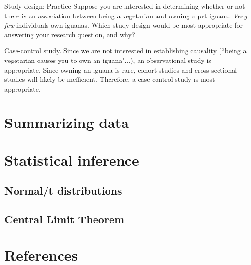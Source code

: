 \documentclass[10pt,t]{beamer}
\begin{document}
\begin{frame}{Study design: Practice}
Suppose you are interested in determining whether or not there is an association between being a vegetarian and owning a pet iguana. \textit{Very few} individuals own iguanas. Which study design would be most appropriate for answering your research question, and why? 

\vspace{0.3cm}

\color{cyan} Case-control study. Since we are not interested in establishing causality (``being a vegetarian causes you to own an iguana"...), an observational study is appropriate. Since owning an iguana is rare, cohort studies and cross-sectional studies will likely be inefficient. Therefore, a case-control study is most appropriate.

\end{frame}

\section{Summarizing data}

\section{Statistical inference}

\subsection{Normal/t distributions}

\subsection{Central Limit Theorem}

\section*{References}
\begin{frame}
\end{frame}
\end{document}
